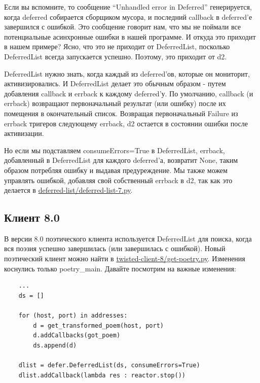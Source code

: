 Если вы вспомните, то сообщение ``Unhandled error in Deferred'' 
генерируется, когда deferred собирается сборщиком мусора, и 
последний callback в deferred'е завершился с ошибкой. Это сообщение 
говорит нам, что мы не поймали все потенциальные асинхронные 
ошибки в нашей программе. И откуда это приходит в нашем примере? 
Ясно, что это не приходит от DeferredList, посколько DeferredList 
всегда запускается успешно. Поэтому, это приходит от d2.


DeferredList нужно знать, когда каждый из deferred'ов, 
которые он мониторит, активизировались. И DeferredList 
делает это обычным образом - путем добавления 
callback и errback к каждому deferred'у. По умолчанию, 
callback (и errback) возвращают первоначальный 
результат (или ошибку) после их помещения в окончательный 
список. Возвращая первоначальный Failure из 
errback тригеров следующему errback, d2 остается в состоянии 
ошибки после активизации.


Но если мы подставляем consumeErrors=True в DeferredList, 
errback, добавленный в DeferredList для каждого 
deferred'а, возвратит None, таким образом потребляя ошибку и 
выдавая предуреждение. Мы также можем управлять ошибкой, добавляя 
свой собственный errback в d2, так как это делается в 
\href{http://github.com/jdavisp3/twisted-intro/blob/master/deferred-list/deferred-list-7.py#L1}{deferred-list/deferred-list-7.py}.


\subsection{Клиент 8.0}


В версии 8.0 поэтического клиента используется DeferredList 
для поиска, когда вся поэзия успешно завершилась (или 
завершилась с ошибкой). Новый поэтический клиент можно 
найти в \href{http://github.com/jdavisp3/twisted-intro/blob/master/twisted-client-8/get-poetry.py#L1}{twisted-client-8/get-poetry.py}. Изменения коснулись только poetry\_main. Давайте 
посмотрим на важные изменения:

\begin{scriptsize}\begin{verbatim}
    ...
    ds = []

    for (host, port) in addresses:
        d = get_transformed_poem(host, port)
        d.addCallbacks(got_poem)
        ds.append(d)

    dlist = defer.DeferredList(ds, consumeErrors=True)
    dlist.addCallback(lambda res : reactor.stop())
\end{verbatim}\end{scriptsize}



